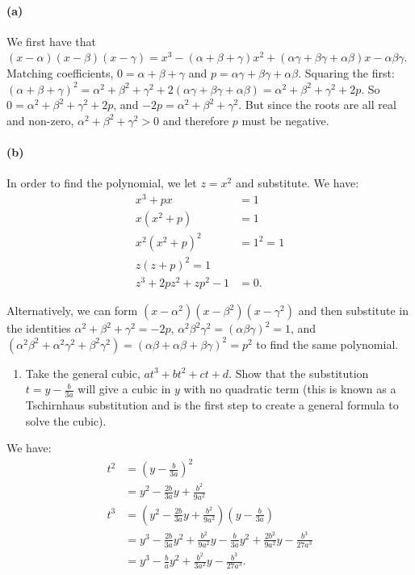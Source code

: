 \documentclass[a4paper,10pt]{article}
\newcommand{\answer}{\bfseries\color{Emerald}\refstepcounter{enumi}\item[\theenumi.]}
\begin{document}
\paragraph{(a)}
We first have that $(x - \alpha)(x - \beta)(x - \gamma) = x^3 - (\alpha + \beta + \gamma)x^2 + (\alpha\gamma + \beta\gamma + \alpha\beta)x - \alpha\beta\gamma$.
Matching coefficients, $ 0 = \alpha + \beta + \gamma $ and $ p = \alpha\gamma + \beta\gamma + \alpha\beta $.
Squaring the first: $ (\alpha + \beta + \gamma)^2 = \alpha^2 + \beta^2 + \gamma^2 + 2(\alpha\gamma + \beta\gamma + \alpha\beta) = \alpha^2 + \beta^2 + \gamma^2 + 2p $.
So $ 0 = \alpha^2 + \beta^2 + \gamma^2 + 2p $, and $ -2p = \alpha^2 + \beta^2 + \gamma^2 $. But since the roots are all real and non-zero, $ \alpha^2 + \beta^2 + \gamma^2 > 0 $
and therefore $ p $ must be negative.

\paragraph{(b)}
In order to find the polynomial, we let $ z = x^2 $ and substitute. We have:
\begin{align*}
  x^3 + px &= 1\\
  x(x^2 + p) &= 1\\
  x^2(x^2 + p)^2 &= 1^2 = 1\\
  z(z+p)^2 = 1\\
  z^3 + 2pz^2 + zp^2 - 1 &= 0.
\end{align*}

Alternatively, we can form $ (x - \alpha^2)(x - \beta^2)(x - \gamma^2) $ and then substitute
in the identities $ \alpha^2 + \beta^2 + \gamma^2 = -2p $, $ \alpha^2 \beta^2 \gamma^2 = (\alpha\beta\gamma)^2 = 1 $,
and $ (\alpha^2\beta^2 + \alpha^2\gamma^2 + \beta^2\gamma^2) = (\alpha\beta + \alpha\beta + \beta\gamma)^2 = p^2 $
to find the same polynomial.

\filbreak\begin{enumerate}[resume]
  \answer Take the general cubic, $ at^3 + bt^2 + ct + d $. Show that the substitution $ t = y - \frac{b}{3a} $
        will give a cubic in $ y $ with no quadratic term (this is known as a Tschirnhaus substitution and is
        the first step to create a general formula to solve the cubic). \label{ex:UnpronouncableTransvestite}
\end{enumerate}

We have:
\begin{align*}
  t^2 &= \left( y - \frac{b}{3a} \right)^2\\
      &= y^2 - \frac{2b}{3a}y + \frac{b^2}{9a^2}\\
  t^3 &= \left( y^2 - \frac{2b}{3a}y + \frac{b^2}{9a^2} \right)\left( y - \frac{b}{3a} \right)\\
      &= y^3 - \frac{2b}{3a}y^2 + \frac{b^2}{9a^2}y - \frac{b}{3a}y^2 + \frac{2b^2}{9a^2}y - \frac{b^3}{27a^3}\\
      &= y^3 - \frac{b}{a}y^2 + \frac{b^2}{3a^2}y - \frac{b^3}{27a^3}.
\end{align*}
\end{document}
